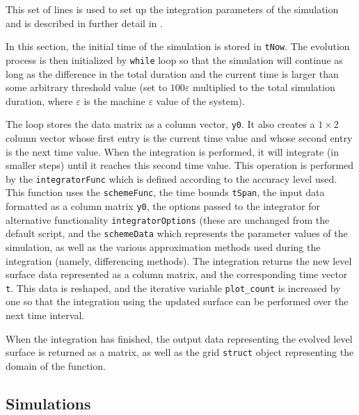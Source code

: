 \documentclass{article}
\begin{document}


This set of lines is used to set up the integration parameters of
the simulation and is described in further detail in
\cite{mitchell}. 



In this section, the initial time of the simulation is stored in
\texttt{tNow}. The evolution process is then initialized by
\texttt{while} loop so that the simulation will continue as long
as the difference in the total duration and the current time is
larger than some arbitrary threshold value (set to
$100\varepsilon$ multiplied to the total simulation duration,
where $\varepsilon$ is the machine $\varepsilon$ value of the
system). 

The loop stores the data matrix as a column vector,
\texttt{y0}. It also creates a $1\times 2$ column vector whose
first entry is the current time value and whose second entry is
the next time value. When the integration is performed, it will
integrate (in smaller steps) until it reaches this second time
value. This operation is performed by the \texttt{integratorFunc}
which is defined according to the accuracy level used. This
function uses the \texttt{schemeFunc}, the time bounds
\texttt{tSpan}, the input data formatted as a column matrix
\texttt{y0}, the options passed to the integrator for alternative
functionality \texttt{integratorOptions} (these are unchanged from
the default script, and the \texttt{schemeData} which represents
the parameter values of the simulation, as well as the various
approximation methods used during the integration (namely,
differencing methods). The integration returns the new level
surface data represented as a column matrix, and the corresponding
time vector \texttt{t}. This data is reshaped, and the iterative
variable \texttt{plot\_count} is increased by one so that the
integration using the updated surface can be performed over the
next time interval.

When the integration has finished, the output data representing
the evolved level surface is returned as a matrix, as well as the
grid \texttt{struct} object representing the domain of the
function. 

\subsection{Simulations}
\label{sec:simulations}
\end{document}
